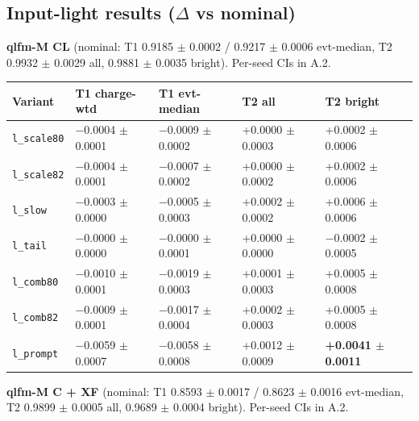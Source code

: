 \documentclass[10pt,a4paper]{article}
\begin{document}
\subsection{Input-light results ($\Delta$ vs nominal)}
\textbf{qlfm-M CL} (nominal: T1 0.9185 $\pm$ 0.0002 / 0.9217 $\pm$ 0.0006 evt-median, T2 0.9932 $\pm$ 0.0029 all, 0.9881 $\pm$ 0.0035 bright). Per-seed CIs in A.2.

\begin{center}\footnotesize
\setlength{\tabcolsep}{3pt}\renewcommand{\arraystretch}{1.15}
\begin{tabularx}{\linewidth}{LLLLL}
\toprule
\textbf{Variant} & \textbf{T1 charge-wtd} & \textbf{T1 evt-median} & \textbf{T2 all} & \textbf{T2 bright} \\
\midrule
\texttt{l\_\allowbreak{}scale80} & $-$0.0004 $\pm$ 0.0001 & $-$0.0009 $\pm$ 0.0002 & +0.0000 $\pm$ 0.0003 & +0.0002 $\pm$ 0.0006 \\
\texttt{l\_\allowbreak{}scale82} & $-$0.0004 $\pm$ 0.0001 & $-$0.0007 $\pm$ 0.0002 & +0.0000 $\pm$ 0.0002 & +0.0002 $\pm$ 0.0006 \\
\texttt{l\_\allowbreak{}slow} & $-$0.0003 $\pm$ 0.0000 & $-$0.0005 $\pm$ 0.0003 & +0.0002 $\pm$ 0.0002 & +0.0006 $\pm$ 0.0006 \\
\texttt{l\_\allowbreak{}tail} & $-$0.0000 $\pm$ 0.0000 & $-$0.0000 $\pm$ 0.0001 & +0.0000 $\pm$ 0.0000 & $-$0.0002 $\pm$ 0.0005 \\
\texttt{l\_\allowbreak{}comb80} & $-$0.0010 $\pm$ 0.0001 & $-$0.0019 $\pm$ 0.0003 & +0.0001 $\pm$ 0.0003 & +0.0005 $\pm$ 0.0008 \\
\texttt{l\_\allowbreak{}comb82} & $-$0.0009 $\pm$ 0.0001 & $-$0.0017 $\pm$ 0.0004 & +0.0002 $\pm$ 0.0003 & +0.0005 $\pm$ 0.0008 \\
\texttt{l\_\allowbreak{}prompt} & $-$0.0059 $\pm$ 0.0007 & $-$0.0058 $\pm$ 0.0008 & +0.0012 $\pm$ 0.0009 & \textbf{+0.0041 $\pm$ 0.0011} \\
\bottomrule
\end{tabularx}
\end{center}
\textbf{qlfm-M C + XF} (nominal: T1 0.8593 $\pm$ 0.0017 / 0.8623 $\pm$ 0.0016 evt-median, T2 0.9899 $\pm$ 0.0005 all, 0.9689 $\pm$ 0.0004 bright). Per-seed CIs in A.2.
\end{document}
